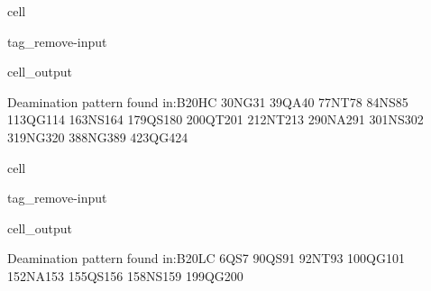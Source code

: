 \documentclass[letterpaper,10pt,english]{jupyterBook}
\begin{document}
\begin{sphinxuseclass}{cell}
\begin{sphinxuseclass}{tag_remove-input}\begin{sphinxVerbatimOutput}

\begin{sphinxuseclass}{cell_output}
\begin{sphinxVerbatim}[commandchars=\\\{\}]
Deamination pattern found in:\PYGZhy{}\PYGZhy{}\PYGZhy{}\PYGZhy{}\PYGZhy{}\PYGZhy{}\PYGZhy{}\PYGZhy{}\PYGZhy{}\PYGZhy{}\PYGZhy{}\PYGZhy{}\PYGZhy{}\PYGZhy{}B20\PYGZus{}HC
30\PYGZhy{}NG\PYGZhy{}31
39\PYGZhy{}QA\PYGZhy{}40
77\PYGZhy{}NT\PYGZhy{}78
84\PYGZhy{}NS\PYGZhy{}85
113\PYGZhy{}QG\PYGZhy{}114
163\PYGZhy{}NS\PYGZhy{}164
179\PYGZhy{}QS\PYGZhy{}180
200\PYGZhy{}QT\PYGZhy{}201
212\PYGZhy{}NT\PYGZhy{}213
290\PYGZhy{}NA\PYGZhy{}291
301\PYGZhy{}NS\PYGZhy{}302
319\PYGZhy{}NG\PYGZhy{}320
388\PYGZhy{}NG\PYGZhy{}389
423\PYGZhy{}QG\PYGZhy{}424
\end{sphinxVerbatim}

\end{sphinxuseclass}\end{sphinxVerbatimOutput}

\end{sphinxuseclass}
\end{sphinxuseclass}
\begin{sphinxuseclass}{cell}
\begin{sphinxuseclass}{tag_remove-input}\begin{sphinxVerbatimOutput}

\begin{sphinxuseclass}{cell_output}
\begin{sphinxVerbatim}[commandchars=\\\{\}]
Deamination pattern found in:\PYGZhy{}\PYGZhy{}\PYGZhy{}\PYGZhy{}\PYGZhy{}\PYGZhy{}\PYGZhy{}\PYGZhy{}\PYGZhy{}\PYGZhy{}\PYGZhy{}\PYGZhy{}\PYGZhy{}\PYGZhy{}B20\PYGZus{}LC
6\PYGZhy{}QS\PYGZhy{}7
90\PYGZhy{}QS\PYGZhy{}91
92\PYGZhy{}NT\PYGZhy{}93
100\PYGZhy{}QG\PYGZhy{}101
152\PYGZhy{}NA\PYGZhy{}153
155\PYGZhy{}QS\PYGZhy{}156
158\PYGZhy{}NS\PYGZhy{}159
199\PYGZhy{}QG\PYGZhy{}200
\end{sphinxVerbatim}

\end{sphinxuseclass}\end{sphinxVerbatimOutput}

\end{sphinxuseclass}
\end{sphinxuseclass}
\end{document}

